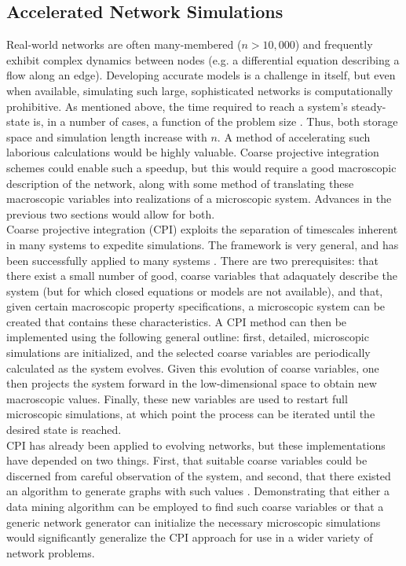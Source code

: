 \documentclass[11pt]{article}
\begin{document}
\subsection{Accelerated Network Simulations}
Real-world networks are often many-membered ($n>10,000$) and frequently exhibit complex dynamics between nodes (e.g. a differential equation describing a flow along an edge). Developing accurate models is a challenge in itself, but even when available, simulating such large, sophisticated networks is computationally prohibitive. As mentioned above, the time required to reach a system's steady-state is, in a number of cases, a function of the problem size \cite{votingmodel1} \cite{votingmodel2} \cite{prefattach}. Thus, both storage space and simulation length increase with $n$. A method of accelerating such laborious calculations would be highly valuable. Coarse projective integration schemes could enable such a speedup, but this would require a good macroscopic description of the network, along with some method of translating these macroscopic variables into realizations of a microscopic system. Advances in the previous two sections would allow for both.\vspace{1mm}\\
Coarse projective integration (CPI) exploits the separation of timescales inherent in many systems to expedite simulations. The framework is very general, and has been successfully applied to many systems \cite{cpi papers}. There are two prerequisites: that there exist a small number of good, coarse variables that adaquately describe the system (but for which closed equations or models are not available), and that, given certain macroscopic property specifications, a microscopic system can be created that contains these characteristics. A CPI method can then be implemented using the following general outline: first, detailed, microscopic simulations are initialized, and the selected coarse variables are periodically calculated as the system evolves. Given this evolution of coarse variables, one then projects the system forward in the low-dimensional space to obtain new macroscopic values. Finally, these new variables are used to restart full microscopic simulations, at which point the process can be iterated until the desired state is reached. \vspace{1mm}\\
CPI has already been applied to evolving networks, but these implementations have depended on two things. First, that suitable coarse variables could be discerned from careful observation of the system, and second, that there existed an algorithm to generate graphs with such values \cite{bold and karthik} \cite{kathik prl}. Demonstrating that either a data mining algorithm can be employed to find such coarse variables or that a generic network generator can initialize the necessary microscopic simulations would significantly generalize the CPI approach for use in a wider variety of network problems. \vspace{1mm}\\
\end{document}
